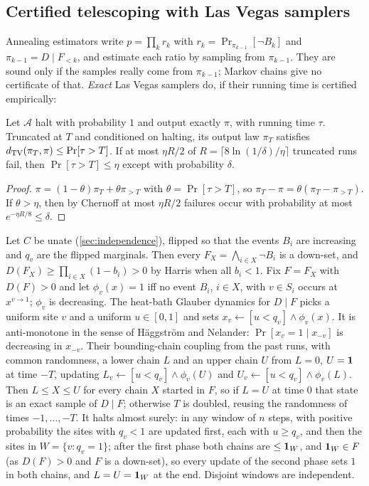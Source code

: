 \subsection{Certified telescoping with Las Vegas samplers}\label{sec:cftp}

Annealing estimators write $p=\prod_kr_k$ with $r_k=\Pr_{\pi_{k-1}}[\neg B_k]$ and
$\pi_{k-1}=D\mid F_{<k}$, and estimate each ratio by sampling from $\pi_{k-1}$. They
are sound only if the samples really come from $\pi_{k-1}$; Markov chains give
no certificate of that. \emph{Exact} Las Vegas samplers do, if their running time
is certified empirically:

\begin{proposition}\label{prop:truncation}
Let $\mathcal A$ halt with probability $1$ and output exactly $\pi$, with running
time $\tau$. Truncated at $T$ and conditioned on halting, its output law
$\pi_T$ satisfies $d_{\rm TV}(\pi_T,\pi)\le\Pr[\tau>T]$. If at most $\eta R/2$ of
$R=\lceil8\ln(1/\delta)/\eta\rceil$ truncated runs fail, then $\Pr[\tau>T]\le\eta$ except
with probability $\delta$.
\end{proposition}

\begin{proof}
$\pi=(1-\theta)\pi_T+\theta\pi_{>T}$ with $\theta=\Pr[\tau>T]$, so
$\pi_T-\pi=\theta(\pi_T-\pi_{>T})$. If $\theta>\eta$, then by Chernoff at most
$\eta R/2$ failures occur with probability at most $e^{-\eta R/8}\le\delta$.
\end{proof}

Let $C$ be unate (\cref{sec:independence}), flipped so that the events $B_i$ are
increasing and $q_v$ are the flipped marginals. Then every
$F_X=\bigwedge_{i\in X}\neg B_i$ is a down-set, and $D(F_X)\ge\prod_{i\in X}(1-b_i)>0$
by Harris when all $b_i<1$. Fix $F=F_X$ with $D(F)>0$ and let $\phi_v(x)=1$ iff no event
$B_i$, $i\in X$, with $v\in S_i$ occurs at $x^{v\to1}$; $\phi_v$ is decreasing. The
heat-bath Glauber dynamics for $D\mid F$ picks a uniform site $v$ and a uniform
$u\in[0,1]$ and sets $x_v\leftarrow[u<q_v]\wedge\phi_v(x)$. It is anti-monotone in the
sense of Häggström and Nelander: $\Pr[x_v=1\mid x_{-v}]$ is decreasing in $x_{-v}$.
Their bounding-chain coupling from the past \cite{hn1998,pw1996} runs, with common
randomness, a lower chain $L$ and an upper chain $U$ from $L=0$, $U=\mathbf{1}$ at time
$-T$, updating $L_v\leftarrow[u<q_v]\wedge\phi_v(U)$ and $U_v\leftarrow[u<q_v]\wedge\phi_v(L)$.
Then $L\le X\le U$ for every chain $X$ started in $F$, so if $L=U$ at time $0$ that
state is an exact sample of $D\mid F$; otherwise $T$ is doubled, reusing the
randomness of times $-1,\dots,-T$. It halts almost surely: in any window of $n$
steps, with positive probability the sites with $q_v<1$ are updated first, each
with $u\ge q_v$, and then the sites in $W=\{v:q_v=1\}$; after the first phase both
chains are $\le\mathbf{1}_W$, and $\mathbf{1}_W\in F$ (as $D(F)>0$ and $F$ is a down-set), so
every update of the second phase sets $1$ in both chains, and $L=U=\mathbf{1}_W$ at the
end. Disjoint windows are independent.

